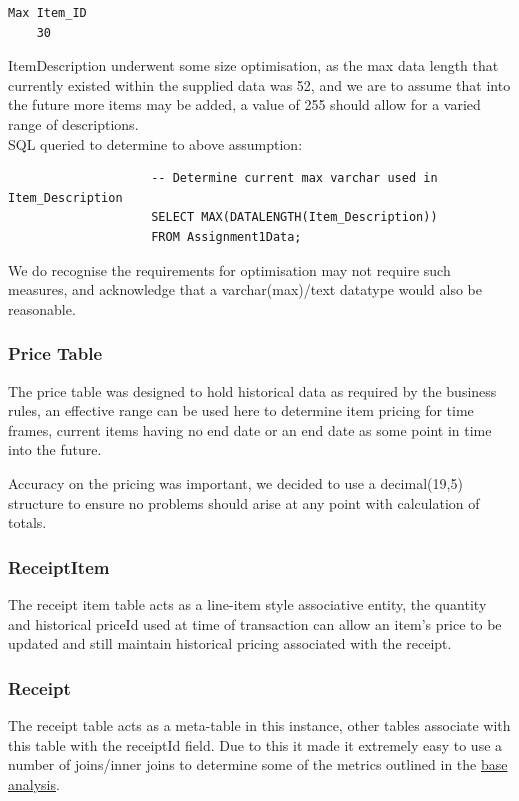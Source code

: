 \documentclass{article}
\begin{document}
                \begin{Verbatim}[fontsize=\small]
    Max Item_ID
    30
                \end{Verbatim}
                ItemDescription underwent some size optimisation, as the max data length 
                that currently existed within the supplied data was 52, and we are to assume
                that into the future more items may be added, a value of 255 should allow
                for a varied range of descriptions.
                \\
                SQL queried to determine to above assumption:

                \begin{lstlisting}
                    -- Determine current max varchar used in Item_Description
                    SELECT MAX(DATALENGTH(Item_Description)) 
                    FROM Assignment1Data;
                \end{lstlisting}

                We do recognise the requirements for optimisation may not require such measures, and 
                acknowledge that a varchar(max)/text datatype would also be reasonable.
            \subsubsection{Price Table}
                The price table was designed to hold historical data as required by the business rules,
                an effective range can be used here to determine item pricing for time frames,
                current items having no end date or an end date as some point in time into the future.
                \par
                Accuracy on the pricing was important, we decided to use a decimal(19,5) structure to
                ensure no problems should arise at any point with calculation of totals.\cite{MoneyIssues}
            \subsubsection{ReceiptItem}
                The receipt item table acts as a line-item style associative entity, the quantity and 
                historical priceId used at time of transaction can allow an item's price to be
                updated and still maintain historical pricing associated with the receipt.
            \subsubsection{Receipt}
                The receipt table acts as a meta-table in this instance, other tables associate with 
                this table with the receiptId field. Due to this it made it extremely easy to use a number
                of joins/inner joins to determine some of the metrics outlined in the \hyperref[sec:BA]{base analysis}.
\end{document}
